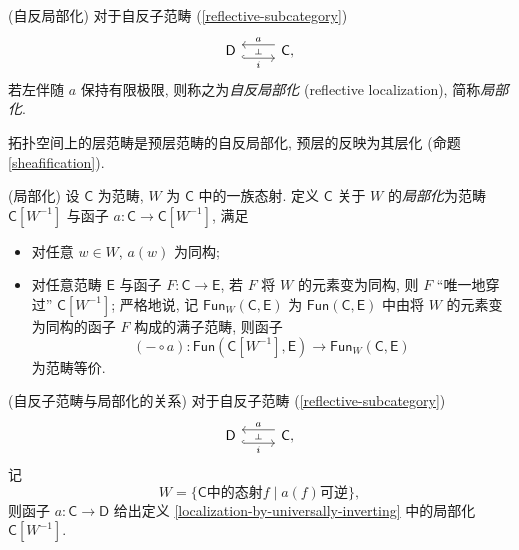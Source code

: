 \begin{definition}
	[label={reflective-localization}]
	{(自反局部化)}
	对于自反子范畴 (\ref{reflective-subcategory}) $$
	\begin{tikzcd}[ampersand replacement=\&]
		{\mathsf D} \& {\mathsf C,}
		\arrow[""{name=0, anchor=center, inner sep=0}, "i"', shift right=2, hook, from=1-1, to=1-2]
		\arrow[""{name=1, anchor=center, inner sep=0}, "a"', shift right=2, from=1-2, to=1-1]
		\arrow["\dashv"{anchor=center, rotate=-90}, draw=none, from=1, to=0]
	\end{tikzcd}
	$$
	若左伴随 $a$ 保持有限极限, 则称之为\emph{自反局部化} (reflective localization), 简称\emph{局部化}.
\end{definition}

\begin{example}
	{}
	拓扑空间上的层范畴是预层范畴的自反局部化, 预层的反映为其层化 (命题 \ref{sheafification}).
\end{example}


\begin{definition}
	[label={localization-by-universally-inverting}]
	{(局部化)}
	设 $\mathsf C$ 为范畴, $W$ 为 $\mathsf C$ 中的一族态射.
	定义 $\mathsf C$ 关于 $W$ 的\emph{局部化}为范畴 $\mathsf C[W^{-1}]$ 与函子 $a\colon \mathsf C\to \mathsf C[W^{-1}]$,
	满足
	\begin{itemize}
		\item 对任意 $w\in W$, $a(w)$ 为同构;
		\item 对任意范畴 $\mathsf E$ 与函子 $F\colon \mathsf C\to\mathsf E$, 若 $F$ 将 $W$ 的元素变为同构,
		则 $F$ ``唯一地穿过'' $\mathsf C[W^{-1}]$; 严格地说, 记 $\mathsf {Fun}_W(\mathsf C,\mathsf E)$ 为
		$\mathsf {Fun}(\mathsf C,\mathsf E)$ 中由将 $W$ 的元素变为同构的函子 $F$ 构成的满子范畴,
		则函子 $$(-\circ a)\colon \mathsf {Fun}(\mathsf C[W^{-1}],\mathsf E) \to \mathsf {Fun}_W(\mathsf C,\mathsf E)$$
		为范畴等价.
	\end{itemize}
\end{definition}


\begin{prop}
	{(自反子范畴与局部化的关系)}
	对于自反子范畴 (\ref{reflective-subcategory}) $$
	\begin{tikzcd}[ampersand replacement=\&]
		{\mathsf D} \& {\mathsf C,}
		\arrow[""{name=0, anchor=center, inner sep=0}, "i"', shift right=2, hook, from=1-1, to=1-2]
		\arrow[""{name=1, anchor=center, inner sep=0}, "a"', shift right=2, from=1-2, to=1-1]
		\arrow["\dashv"{anchor=center, rotate=-90}, draw=none, from=1, to=0]
	\end{tikzcd}
	$$
	记
	$$
	W = \big\{
	\text{$\mathsf C$中的态射$f$} \mid \text{$a(f)$可逆}
	\big\},
	$$
	则函子 $a\colon \mathsf C\to\mathsf D$ 给出定义 \ref{localization-by-universally-inverting} 中的局部化 $\mathsf C[W^{-1}]$.
\end{prop}


